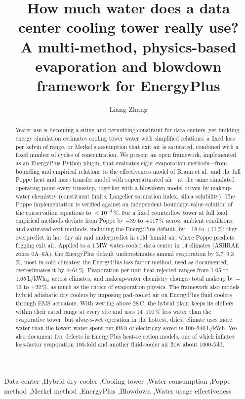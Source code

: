 \documentclass[preprint,12pt,authoryear]{elsarticle}
\newcommand{\tbd}[1]{\textcolor{red}{[#1]}}
\begin{document}
\begin{frontmatter}
\title{How much water does a data center cooling tower really use?\\
A multi-method, physics-based evaporation and blowdown framework for EnergyPlus}

\author{Liang Zhang}
\address{Department of Civil and Architectural Engineering and Mechanics, University of Arizona, Tucson, AZ, USA \tbd{confirm affiliation}}

\begin{abstract}
Water use is becoming a siting and permitting constraint for data centers, yet building energy simulation
estimates cooling tower water with simplified relations: a fixed loss per kelvin of range, or Merkel's
assumption that exit air is saturated, combined with a fixed number of cycles of concentration.
We present an open framework, implemented as an EnergyPlus Python plugin, that evaluates eight
evaporation methods---from bounding and empirical relations to the effectiveness model of Braun et al.\ and the full
Poppe heat and mass transfer model with supersaturated air---at the same simulated operating point every
timestep, together with a blowdown model driven by makeup-water chemistry (constituent limits, Langelier
saturation index, silica solubility). The Poppe implementation is verified against an independent
boundary-value solution of the conservation equations to $<10^{-4}$\,\%.
For a fixed counterflow tower at full load, empirical methods deviate from Poppe by $-$39 to +117\,\% across
ambient conditions, and saturated-exit methods, including the EnergyPlus default, by $-$18 to +11\,\%:
they overpredict in hot--dry air and underpredict in cold--humid air, where Poppe predicts fogging exit air.
Applied to a 1\,MW water-cooled data center in 14 climates (ASHRAE zones 0A--6A), the EnergyPlus default
underestimates annual evaporation by 3.7--9.3\,\%, most in cold climates; the EnergyPlus loss-factor method,
used as documented, overestimates it by 4--64\,\%. Evaporation per unit heat rejected ranges from 1.05 to
1.65\,L/kWh$_{th}$ across climates, and makeup-water chemistry changes total makeup by $-$13 to +22\,\%, as much as
the choice of evaporation physics. The framework also models hybrid adiabatic dry coolers by imposing pad-cooled air on EnergyPlus fluid coolers
through EMS actuators. With wetting above 28\,\textdegree C, the hybrid plant keeps its chillers within their rated
range at every site and uses 14--100\,\% less water than the evaporative tower, but always-wet operation in the
hottest, driest climate uses more water than the tower; water spent per kWh of electricity saved is 100--240\,L/kWh.
We also document five defects in EnergyPlus heat-rejection models, one of which inflates loss-factor evaporation
100-fold and another fluid-cooler air flow about 1000-fold.
\end{abstract}

\begin{keyword}
Data center \sep Hybrid dry cooler \sep Cooling tower \sep Water consumption \sep Poppe method \sep Merkel method \sep EnergyPlus \sep Blowdown \sep Water usage effectiveness
\end{keyword}
\end{frontmatter}
\end{document}
